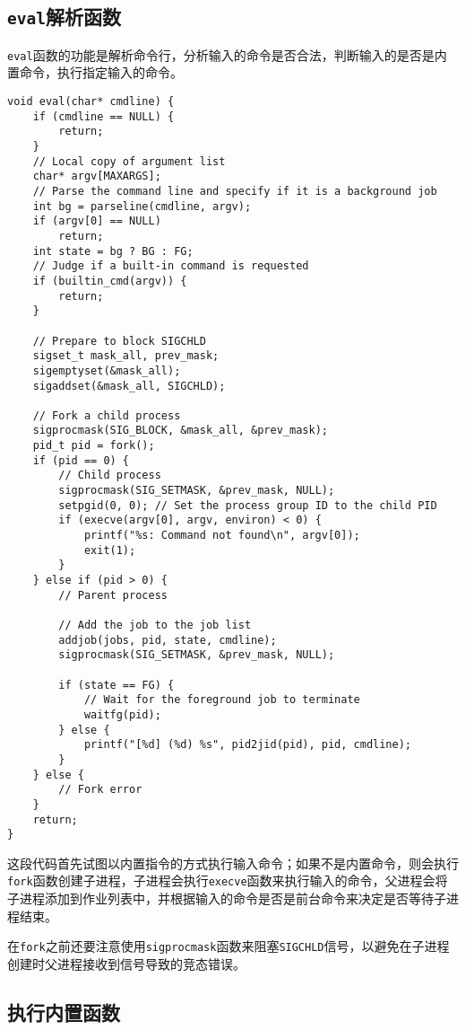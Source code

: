\documentclass[a4paper, 11pt]{ctexart}
\begin{document}
\subsection{\texttt{eval}解析函数}

\texttt{eval}函数的功能是解析命令行，分析输入的命令是否合法，判断输入的是否是内置命令，执行指定输入的命令。

\begin{verbatim}
void eval(char* cmdline) {
    if (cmdline == NULL) {
        return;
    }
    // Local copy of argument list
    char* argv[MAXARGS];
    // Parse the command line and specify if it is a background job
    int bg = parseline(cmdline, argv);
    if (argv[0] == NULL)
        return;
    int state = bg ? BG : FG;
    // Judge if a built-in command is requested
    if (builtin_cmd(argv)) {
        return;
    }

    // Prepare to block SIGCHLD
    sigset_t mask_all, prev_mask;
    sigemptyset(&mask_all);
    sigaddset(&mask_all, SIGCHLD);

    // Fork a child process
    sigprocmask(SIG_BLOCK, &mask_all, &prev_mask);
    pid_t pid = fork();
    if (pid == 0) {
        // Child process
        sigprocmask(SIG_SETMASK, &prev_mask, NULL);
        setpgid(0, 0); // Set the process group ID to the child PID
        if (execve(argv[0], argv, environ) < 0) {
            printf("%s: Command not found\n", argv[0]);
            exit(1);
        }
    } else if (pid > 0) {
        // Parent process

        // Add the job to the job list
        addjob(jobs, pid, state, cmdline);
        sigprocmask(SIG_SETMASK, &prev_mask, NULL);

        if (state == FG) {
            // Wait for the foreground job to terminate
            waitfg(pid);
        } else {
            printf("[%d] (%d) %s", pid2jid(pid), pid, cmdline);
        }
    } else {
        // Fork error
    }
    return;
}
\end{verbatim}

这段代码首先试图以内置指令的方式执行输入命令；如果不是内置命令，则会执行\texttt{fork}函数创建子进程，子进程会执行\texttt{execve}函数来执行输入的命令，父进程会将子进程添加到作业列表中，并根据输入的命令是否是前台命令来决定是否等待子进程结束。

在\texttt{fork}之前还要注意使用\texttt{sigprocmask}函数来阻塞\texttt{SIGCHLD}信号，以避免在子进程创建时父进程接收到信号导致的竞态错误。

\subsection{执行内置函数}
\end{document}
